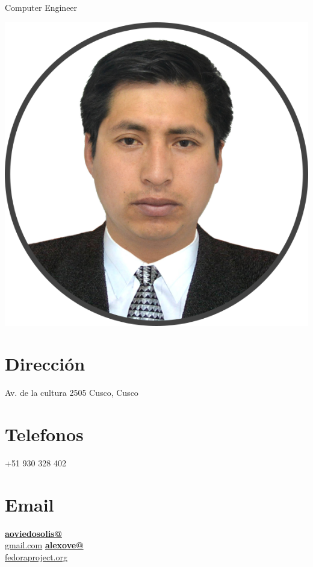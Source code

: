 \documentclass[]{friggeri-cv}
\begin{document}
{Computer Engineer}


\begin{aside}
    \includegraphics[scale=0.18]{img/aoviedo.png}
    \section{Direcci\'on}
    Av. de la cultura 2505
    Cusco, Cusco
    ~
    \section{Telefonos}
    +51 930 328 402
    ~
    \section{Email}
    \href{mailto:aoviedosolis@gmail.com}{\textbf{aoviedosolis@}\\gmail.com}
    \href{mailto:alexove@fedoraproject.org}{\textbf{alexove@}\\fedoraproject.org}
    ~

\end{aside}
\end{document}
